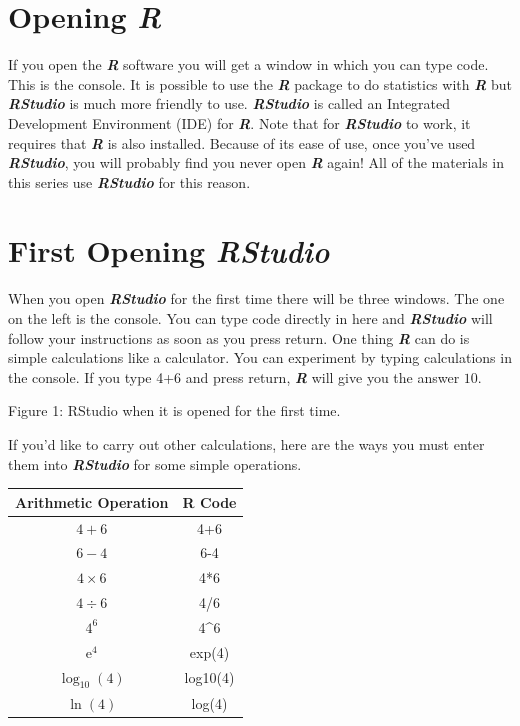 \documentclass[
]{book}
\begin{document}
\section{\texorpdfstring{Opening \textbf{\emph{R}}}{Opening R}}\label{opening-r}

If you open the \textbf{\emph{R}} software you will get a window in which you can type code. This is the console. It is possible to use the \textbf{\emph{R}} package to do statistics with \textbf{\emph{R}} but \textbf{\emph{RStudio}} is much more friendly to use. \textbf{\emph{RStudio}} is called an Integrated Development Environment (IDE) for \textbf{\emph{R}}. Note that for \textbf{\emph{RStudio}} to work, it requires that \textbf{\emph{R}} is also installed. Because of its ease of use, once you've used \textbf{\emph{RStudio}}, you will probably find you never open \textbf{\emph{R}} again! All of the materials in this series use \textbf{\emph{RStudio}} for this reason.

\section{\texorpdfstring{First Opening \textbf{\emph{RStudio}}}{First Opening RStudio}}\label{first-opening-rstudio}

When you open \textbf{\emph{RStudio}} for the first time there will be three windows. The one on the left is the console. You can type code directly in here and \textbf{\emph{RStudio}} will follow your instructions as soon as you press return. One thing \textbf{\emph{R}} can do is simple calculations like a calculator. You can experiment by typing calculations in the console. If you type 4+6 and press return, \textbf{\emph{R}} will give you the answer \(10\).

Figure 1: RStudio when it is opened for the first time.

If you'd like to carry out other calculations, here are the ways you must enter them into \textbf{\emph{RStudio}} for some simple operations.

\begin{longtable}[]{@{}cc@{}}
\toprule\noalign{}
Arithmetic Operation & R Code \\
\midrule\noalign{}
\endhead
\bottomrule\noalign{}
\endlastfoot
\(4+6\) & 4+6 \\
\(6-4\) & 6-4 \\
\(4 \times 6\) & 4*6 \\
\(4 \div 6\) & 4/6 \\
\(4^{6}\) & 4\^{}6 \\
\(\mathrm{e}^{4}\) & exp(4) \\
\(\log_{10} (4)\) & log10(4) \\
\(\ln(4)\) & log(4) \\
\end{longtable}
\end{document}
